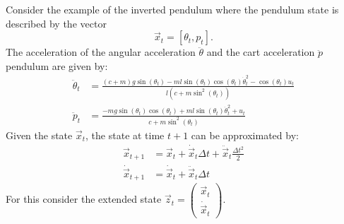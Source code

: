 \begin{exercise}[subtitle={Paper + Notebook}]
Consider the example of the inverted pendulum where the pendulum state is described by the vector
\begin{equation}
\vec x_t = [\theta_t,p_t].%
\end{equation}
The acceleration of the angular acceleration $\ddot{\theta}$ and the cart acceleration $\ddot{p}$ pendulum are given by:
\begin{align}
  \ddot \theta_t & = \frac{(c+m)g\sin(\theta_t)-ml\sin(\theta_t)\cos(\theta_t)\dot\theta_t^2-\cos(\theta_t) u_t}{l(c+m\sin^2(\theta_t))}\label{eq:theta} \\
  \ddot p_t &=\frac{-mg\sin(\theta_t)\cos(\theta_t)+ml\sin(\theta_t)\dot\theta_t^2+u_t}{c+m\sin^2(\theta_t)}\label{eq:p}
\end{align}
Given the state $\vec{x}_t$, the state at time $t+1$ can be approximated by:
\begin{equation}
\label{eq:verlet}
\begin{aligned}
\vec x_{t+1} &= \vec x_t + \dot{\vec{x}}_{t} \Delta t + \ddot{\vec x}_t \frac{\Delta t^2}{2} \\
\dot {\vec x}_{t+1} &= \dot{\vec x}_t + \ddot{\vec{x}}_{t} \Delta t
\end{aligned}
\end{equation}
For this consider the extended state $\vec z_t = \begin{pmatrix} \vec x_t\\ \dot{\vec x}_t\end{pmatrix}$.


\end{exercise}
